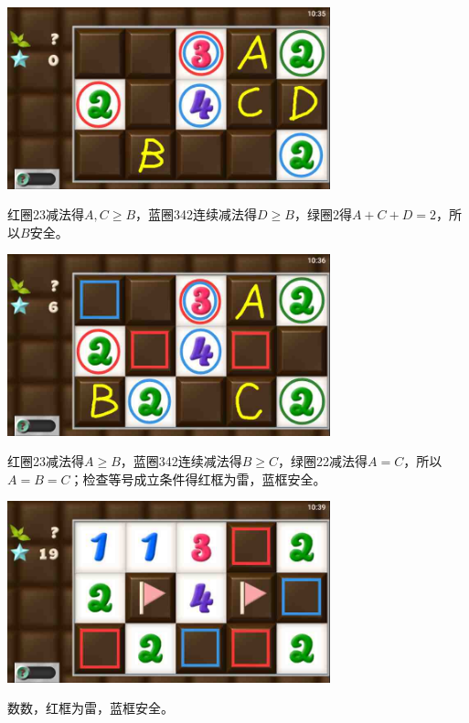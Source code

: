 \subsection{} %
\begin{center}
    \includegraphics[width=0.7\textwidth]{puzzlelow/180-1.jpg}
\end{center}
红圈23减法得$A,C\ge B$，蓝圈342连续减法得$D\ge B$，绿圈2得$A+C+D=2$，所以$B$安全。
\begin{center}
    \includegraphics[width=0.7\textwidth]{puzzlelow/180-2.jpg}
\end{center}
红圈23减法得$A\ge B$，蓝圈342连续减法得$B\ge C$，绿圈22减法得$A=C$，所以$A=B=C$；检查等号成立条件得红框为雷，蓝框安全。
\begin{center}
    \includegraphics[width=0.7\textwidth]{puzzlelow/180-3.jpg}
\end{center}
数数，红框为雷，蓝框安全。

